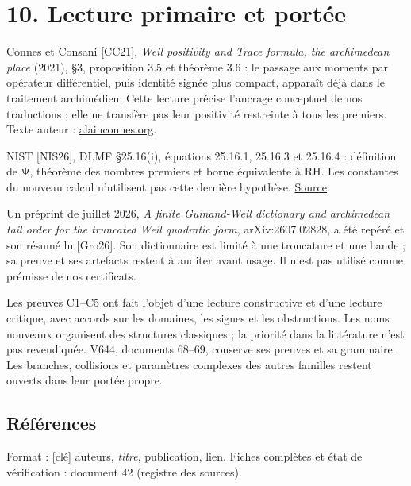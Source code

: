 \documentclass[
  10pt,
  a4paper,
]{article}
\begin{document}
\hypertarget{lecture-primaire-et-portuxe9e}{%
\section{10. Lecture primaire et
portée}\label{lecture-primaire-et-portuxe9e}}

Connes et Consani {[}CC21{]}, \emph{Weil positivity and Trace formula,
the archimedean place} (2021), §3, proposition 3.5 et théorème 3.6 : le
passage aux moments par opérateur différentiel, puis identité signée
plus compact, apparaît déjà dans le traitement archimédien. Cette
lecture précise l'ancrage conceptuel de nos traductions ; elle ne
transfère pas leur positivité restreinte à tous les premiers. Texte
auteur :
\href{https://alainconnes.org/wp-content/uploads/Selecta.pdf}{alainconnes.org}.

NIST {[}NIS26{]}, DLMF §25.16(i), équations 25.16.1, 25.16.3 et 25.16.4
: définition de Ψ, théorème des nombres premiers et borne équivalente à
RH. Les constantes du nouveau calcul n'utilisent pas cette dernière
hypothèse. \href{https://dlmf.nist.gov/25.16}{Source}.

Un préprint de juillet 2026, \emph{A finite Guinand-Weil dictionary and
archimedean tail order for the truncated Weil quadratic form},
arXiv:2607.02828, a été repéré et son résumé lu {[}Gro26{]}. Son
dictionnaire est limité à une troncature et une bande ; sa preuve et ses
artefacts restent à auditer avant usage. Il n'est pas utilisé comme
prémisse de nos certificats.

Les preuves C1--C5 ont fait l'objet d'une lecture constructive et d'une
lecture critique, avec accords sur les domaines, les signes et les
obstructions. Les noms nouveaux organisent des structures classiques ;
la priorité dans la littérature n'est pas revendiquée. V644, documents
68--69, conserve ses preuves et sa grammaire. Les branches, collisions
et paramètres complexes des autres familles restent ouverts dans leur
portée propre.

\hypertarget{ruxe9fuxe9rences}{%
\subsection{Références}\label{ruxe9fuxe9rences}}

Format : {[}clé{]} auteurs, \emph{titre}, publication, lien. Fiches
complètes et état de vérification : document 42 (registre des sources).
\end{document}
